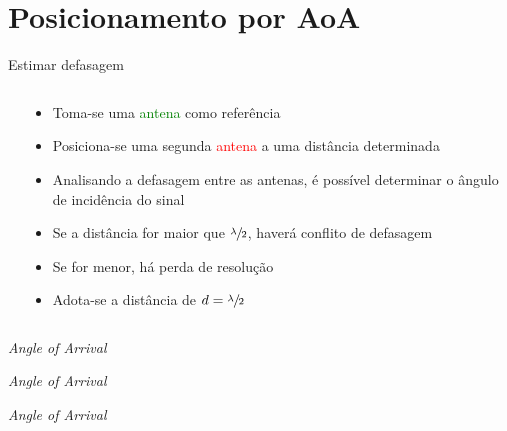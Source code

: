 \section{Posicionamento por AoA}

    \begin{frame}{Estimar defasagem}
                \begin{columns}
            \begin{column}{0.45\textwidth}
                \centering \vfill
                \vfill
                \visible<5->{}\vfill
                \vfill
            \end{column}
            \begin{column}{0.55\textwidth}
                \begin{itemize}[<+(-1)->]
                    \item Toma-se uma \textcolor{Green}{antena} como referência
                    \item Posiciona-se uma segunda \textcolor{Red}{antena} a uma distância determinada
                    \item Analisando a defasagem entre as antenas, é possível determinar o ângulo de incidência do sinal
                    \item Se a distância for maior que $\sfrac{\lambda}{2}$, haverá conflito de defasagem
                    \item Se for menor, há perda de resolução
                    \item Adota-se a distância de $d = \sfrac{\lambda}{2}$
                \end{itemize}
            \end{column}
        \end{columns}
    \end{frame}

    \begin{frame}{\textit{Angle of Arrival}}
        
    \end{frame}

    \begin{frame}{\textit{Angle of Arrival}}
        
    \end{frame}

    \begin{frame}{\textit{Angle of Arrival}}
        
    \end{frame}

